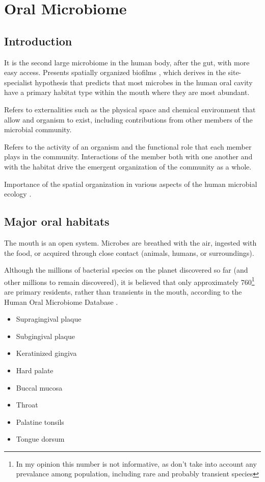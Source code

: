 \chapter{Oral Microbiome}\label{chp:oral_microbiome}

\minitoc

\section{Introduction}

It is the second large microbiome in the human body, after the gut, with more easy access. Presents spatially organized 
biofilms \cite{Welch2020,Wilbert2020}, which derives in the site-specialist hypothesis that predicts that most microbes 
in the human oral cavity have a primary habitat type within the mouth where they are most abundant. 

\begin{definition}[Habitat]
Refers to externalities such as the physical space and chemical environment that allow and organism to exist, 
including contributions from other members of the microbial community.    
\end{definition}
\begin{definition}[Niche]
Refers to the activity of an organism and the functional role that each member plays in the community. Interactions of 
the member both with one another and with the habitat drive the emergent organization of the community as a whole.
\end{definition}

Importance of the spatial organization in various aspects of the human microbial ecology \cite{Proctor2017}.  

\section{Major oral habitats}
The mouth is an open system. Microbes are breathed with the air, ingested with the food, or acquired through close 
contact (animals, humans, or surroundings). 

Although the millions of bacterial species on the planet discovered so far (and other millions to remain discovered), 
it is believed that only approximately 760\footnote{In my opinion this number is not informative, as don't 
take into account any prevalance among population, including rare and probably transient species} are primary residents, rather than transients in the mouth, according to the 
Human Oral Microbiome Database \cite{Escapa2018} .
\begin{itemize}
    \item Supragingival plaque
    \item Subgingival plaque 
    \item Keratinized gingiva 
    \item Hard palate 
    \item Buccal mucosa 
    \item Throat 
    \item Palatine tonsils 
    \item Tongue dorsum 
\end{itemize}

